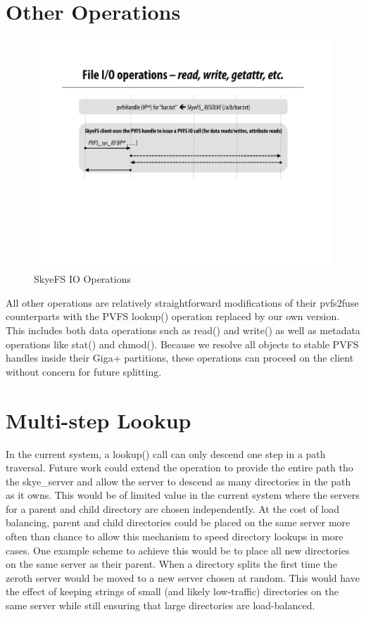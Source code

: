 \documentclass[letterpaper]{article}
\begin{document}
\section{Other Operations}
\begin{figure}
\begin{center}
\includegraphics[scale=0.4]{figure-other}
\end{center}
\caption{SkyeFS IO Operations}
\end{figure}
All other operations are relatively straightforward modifications of their
pvfs2\-fuse counterparts with the PVFS lookup() operation replaced by our own
version.  This includes both data operations such as read() and write() as well
as metadata operations like stat() and chmod().  Because we resolve all objects
to stable PVFS handles inside their Giga+ partitions, these operations can
proceed on the client without concern for future splitting.

\section{Multi-step Lookup}
In the current system, a lookup() call can only descend one step in a path
traversal.  Future work could extend the operation to provide the entire path
tho the skye\_\-server and allow the server to descend as many directories in the
path as it owns.  This would be of limited value in the current system where the
servers for a parent and child directory are chosen independently.  At the cost
of load balancing, parent and child directories could be placed on the same
server more often than chance to allow this mechanism to speed directory lookups
in more cases.  One example scheme to achieve this would be to place all new
directories on the same server as their parent.  When a directory splits the
first time the zeroth server would be moved to a new server chosen at random.
This would have the effect of keeping strings of small (and likely low-traffic)
directories on the same server while still ensuring that large directories are
load-balanced.
\end{document}
